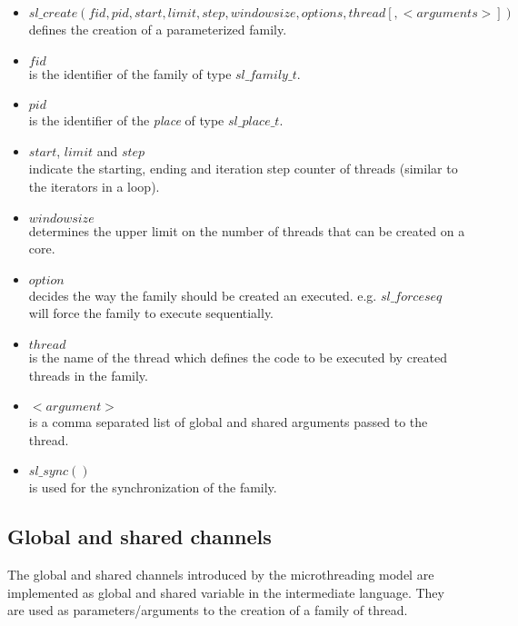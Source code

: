 \documentclass{article}
\begin{document}
\begin{itemize}

\item $sl\_create(fid, pid, start, limit, step, windowsize, options, thread [,
    <arguments>])$ \\defines the creation of a parameterized family.

\item $fid$ \\ is the identifier of the family of type $sl\_family\_t$.
    
\item $pid$ \\ is the identifier of the \emph{place} of type $sl\_place\_t$.

\item $start$, $limit$ and $step$ \\ indicate the starting, ending and
    iteration step counter of threads (similar to the iterators in a loop).

\item $windowsize$ \\ determines the upper limit on the number of threads that
    can be created on a core.

\item $option$ \\ decides the way the family should be created an executed.
    e.g. $sl\_forceseq$ will force the family to execute sequentially.

\item $thread$ \\ is the name of the thread which defines the code to be
    executed by created threads in the family.

\item $<argument>$ \\ is a comma separated list of global and shared arguments
    passed to the thread.

\item $sl\_sync()$ \\ is used for the synchronization of the family.

\end{itemize}

\subsection*{Global and shared channels}

The global and shared channels introduced by the microthreading model are
implemented as global and shared variable in the intermediate language. They
are used as parameters/arguments to the creation of a family of thread.
\end{document}
